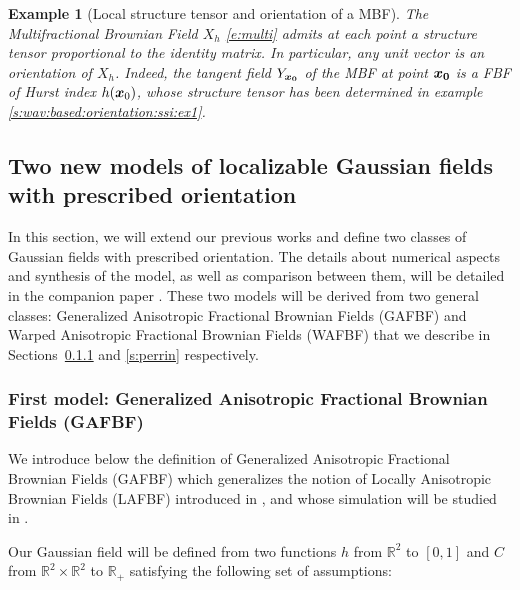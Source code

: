 \documentclass{elsarticle}
\newtheorem{example}{Example}
\begin{document}
\begin{example}[Local structure tensor and orientation of a MBF]
\label{pro:ex:multi}
The Multifractional Brownian Field $X_h$ \eqref{e:multi} admits at each point a structure tensor proportional to the identity matrix. In particular, any unit vector is an orientation of $X_h$.
Indeed, the tangent field $Y_{\bm{x_0}}$ of the MBF at point $\bm{x_0}$ is a FBF of Hurst index $h(\bm{x}_0)$, whose structure tensor has been determined in example \ref{s:wav:based:orientation:ssi:ex1}.
\end{example}

\subsection{Two new models of localizable Gaussian fields with prescribed orientation\\}\label{s:ex-orientation-localizable}

In this section, we will extend our previous works \cite{PCCP14,PCCP15} and define two classes of Gaussian fields with prescribed orientation. The details about numerical aspects and synthesis of the model, as well as comparison between them, will be detailed in the companion paper \cite{polisano2017simulation}. These two models will be derived from two general classes: Generalized Anisotropic Fractional Brownian Fields (GAFBF) and 
Warped  Anisotropic Fractional Brownian Fields (WAFBF)  that we describe in Sections~\ref{s:CFBA} and \ref{s:perrin} respectively.

\subsubsection{First model: Generalized Anisotropic Fractional Brownian Fields (GAFBF)\\}\label{s:CFBA}

We introduce below the definition of Generalized Anisotropic Fractional Brownian Fields (GAFBF) which generalizes the notion of Locally Anisotropic Brownian Fields (LAFBF) introduced in \cite{PCCP14},  and whose simulation will be studied in \cite{polisano2017simulation}. 

Our Gaussian field will be defined from two functions $h$ from $\mathbb{R}^2$ to $[0,1]$ and $C$ from $\mathbb{R}^2\times \mathbb{R}^2$ to $\mathbb{R_+}$ satisfying the following set of assumptions:\\
\end{document}
